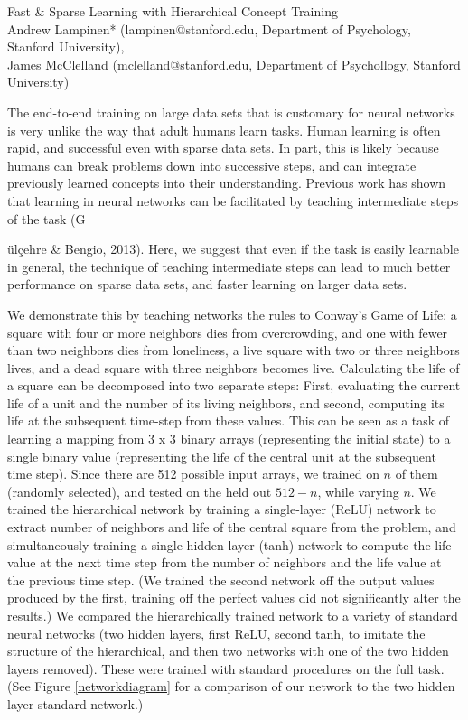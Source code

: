 \documentclass[10pt]{article}
\begin{document}
\begingroup  
  \centering
  \large Fast \& Sparse Learning with Hierarchical Concept Training\\[1em]
  \small{Andrew Lampinen* (lampinen@stanford.edu, Department of Psychology, Stanford University),\\ James McClelland (mclelland@stanford.edu, Department of Psychollogy, Stanford University)}\par
\endgroup
\vspace{10pt}
The end-to-end training on large data sets that is customary for neural networks is very unlike the way that adult humans learn tasks. Human learning is often rapid, and successful even with sparse data sets. In part, this is likely because humans can break problems down into successive steps, and can integrate previously learned concepts into their understanding. Previous work has shown that learning in neural networks can be facilitated by teaching intermediate steps of the task (G{\"{u}l\c{c}ehre \& Bengio, 2013). Here, we suggest that even if the task is easily learnable in general, the technique of teaching intermediate steps can lead to much better performance on sparse data sets, and faster learning on larger data sets.\par
We demonstrate this by teaching networks the rules to Conway's Game of Life: a square with four or more neighbors dies from overcrowding, and one with fewer than two neighbors dies from loneliness, a live square with two or three neighbors lives, and a dead square with three neighbors becomes live. Calculating the life of a square can be decomposed into two separate steps: First, evaluating the current life of a unit and the number of its living neighbors, and second, computing its life at the subsequent time-step from these values. This can be seen as a task of learning a mapping from 3 x 3 binary arrays (representing the initial state) to a single binary value (representing the life of the central unit at the subsequent time step). Since there are 512 possible input arrays, we trained on $n$ of them (randomly selected), and tested on the held out $512-n$, while varying $n$. We trained the hierarchical network by training a single-layer (ReLU) network to extract number of neighbors and life of the central square from the problem, and simultaneously training a single hidden-layer (tanh) network to compute the life value at the next time step from the number of neighbors and the life value at the previous time step. (We trained the second network off the output values produced by the first, training off the perfect values did not significantly alter the results.) We compared the hierarchically trained network to a variety of standard neural networks (two hidden layers, first ReLU, second tanh, to imitate the structure of the hierarchical, and then two networks with one of the two hidden layers removed). These were trained with standard procedures on the full task. (See Figure \ref{networkdiagram} for a comparison of our network to the two hidden layer standard network.)\par
}
\end{document}
